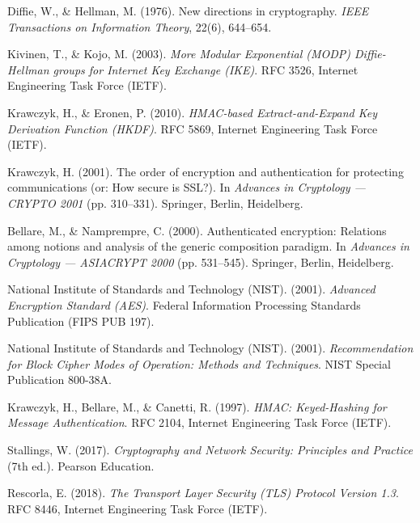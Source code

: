 \documentclass[11pt,a4paper]{article}
\begin{document}
\begin{enumerate}[leftmargin=1cm, label={[\arabic*]}]
    \item Diffie, W., \& Hellman, M. (1976). New directions in cryptography. \textit{IEEE Transactions on Information Theory}, 22(6), 644--654.
    \item Kivinen, T., \& Kojo, M. (2003). \textit{More Modular Exponential (MODP) Diffie-Hellman groups for Internet Key Exchange (IKE)}. RFC 3526, Internet Engineering Task Force (IETF).
    \item Krawczyk, H., \& Eronen, P. (2010). \textit{HMAC-based Extract-and-Expand Key Derivation Function (HKDF)}. RFC 5869, Internet Engineering Task Force (IETF).
    \item Krawczyk, H. (2001). The order of encryption and authentication for protecting communications (or: How secure is SSL?). In \textit{Advances in Cryptology --- CRYPTO 2001} (pp. 310--331). Springer, Berlin, Heidelberg.
    \item Bellare, M., \& Namprempre, C. (2000). Authenticated encryption: Relations among notions and analysis of the generic composition paradigm. In \textit{Advances in Cryptology --- ASIACRYPT 2000} (pp. 531--545). Springer, Berlin, Heidelberg.
    \item National Institute of Standards and Technology (NIST). (2001). \textit{Advanced Encryption Standard (AES)}. Federal Information Processing Standards Publication (FIPS PUB 197).
    \item National Institute of Standards and Technology (NIST). (2001). \textit{Recommendation for Block Cipher Modes of Operation: Methods and Techniques}. NIST Special Publication 800-38A.
    \item Krawczyk, H., Bellare, M., \& Canetti, R. (1997). \textit{HMAC: Keyed-Hashing for Message Authentication}. RFC 2104, Internet Engineering Task Force (IETF).
    \item Stallings, W. (2017). \textit{Cryptography and Network Security: Principles and Practice} (7th ed.). Pearson Education.
    \item Rescorla, E. (2018). \textit{The Transport Layer Security (TLS) Protocol Version 1.3}. RFC 8446, Internet Engineering Task Force (IETF).
\end{enumerate}
\end{document}
